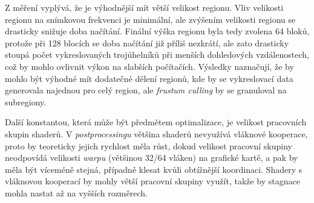 \begin{figure}[H]
	\begin{minipage}{0.49\textwidth}
	\end{minipage}
	\hfill
	\begin{minipage}{0.49\textwidth}
	\end{minipage}
\end{figure}

Z měření vyplývá, že je výhodnější mít větší velikost regionu. Vliv velikosti regionu na snímkovou frekvenci je minimální, ale zvýšením velikosti regionu se drasticky snižuje doba načítání. Finální výška regionu byla tedy zvolena 64 bloků, protože při 128 blocích se doba načítání již příliš nezkrátí, ale zato drasticky stoupá počet vykreslovaných trojúhelníků při menších dohledových vzdálenostech, což by mohlo ovlivnit výkon na slabších počítačích. Výsledky naznačují, že by mohlo být výhodné mít dodatečné dělení regionů, kde by se vykreslovací data generovala najednou pro celý region, ale \textit{frustum culling} by se granuloval na subregiony.

Další konstantou, která může být předmětem optimalizace, je velikost pracovních skupin shaderů. V \textit{postprocessingu} většina shaderů nevyužívá vláknové kooperace, proto by teoreticky jejich rychlost měla růst, dokud velikost pracovní skupiny neodpovídá velikosti \textit{warpu} (většinou 32/64 vláken) na grafické kartě, a pak by měla být víceméně stejná, případně klesat kvůli obtížnější koordinaci. Shadery s vláknovou kooperací by mohly větší pracovní skupiny využít, takže by stagnace mohla nastat až na vyšších rozměrech.

